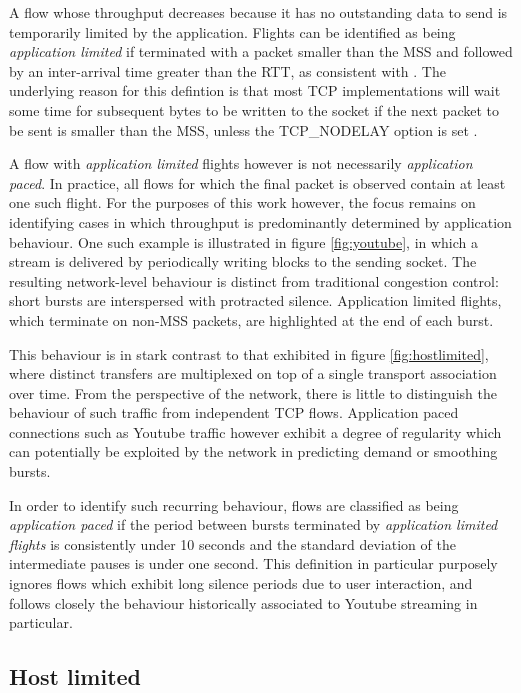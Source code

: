 A flow whose throughput decreases because it has no outstanding data to send is temporarily limited by the application. 
Flights can be identified as being \emph{application limited} if terminated with a packet smaller than the \ac{MSS} and followed by an inter-arrival time greater than the \ac{RTT}, as consistent with \cite{Zhang:2002p85}. 
The underlying reason for this defintion is that most \ac{TCP} implementations will wait some time for subsequent bytes to be written to the socket if the next packet to be sent is smaller than the \ac{MSS}, unless the \ac{TCP}\_NODELAY option is set \cite{nagle1984rfc}.

A flow with \emph{application limited} flights however is not necessarily \emph{application paced}. 
In practice, all flows for which the final packet is observed contain at least one such flight.
For the purposes of this work however, the focus remains on identifying cases in which throughput is predominantly determined by application behaviour.
One such example is illustrated in figure \ref{fig:youtube}, in which a stream is delivered by periodically writing blocks to the sending socket.
The resulting network-level behaviour is distinct from traditional congestion control: short bursts are interspersed with protracted silence.
Application limited flights, which terminate on non-\ac{MSS} packets, are highlighted at the end of each burst.

This behaviour is in stark contrast to that exhibited in figure \ref{fig:hostlimited}, where distinct transfers are multiplexed on top of a single transport association over time.
From the perspective of the network, there is little to distinguish the behaviour of such traffic from independent \ac{TCP} flows.
Application paced connections such as Youtube traffic however exhibit a degree of regularity which can potentially be exploited by the network in predicting demand or smoothing bursts.

In order to identify such recurring behaviour, flows are classified as being \emph{application paced} if the period between bursts terminated by \emph{application limited flights} is consistently under 10 seconds and the standard deviation of the intermediate pauses is under one second.
This definition in particular purposely ignores flows which exhibit long silence periods due to user interaction, and follows closely the behaviour historically associated to Youtube streaming in particular.

\subsection{Host limited}
\label{section:rate:host}

